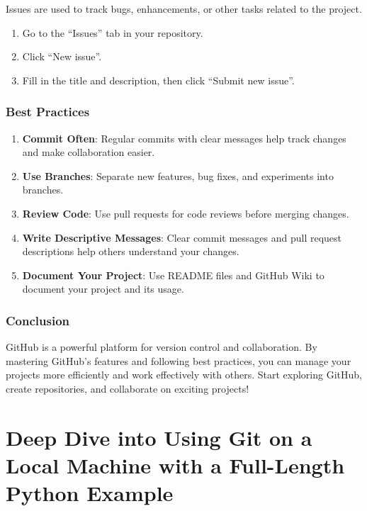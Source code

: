 \documentclass[
  letterpaper,
  DIV=11,
  numbers=noendperiod]{scrreprt}
\providecommand{\tightlist}{%
  \setlength{\itemsep}{0pt}\setlength{\parskip}{0pt}}\usepackage{longtable,booktabs,array}
\begin{document}
Issues are used to track bugs, enhancements, or other tasks related to
the project.

\begin{enumerate}
\def\labelenumi{\arabic{enumi}.}
\tightlist
\item
  Go to the ``Issues'' tab in your repository.
\item
  Click ``New issue''.
\item
  Fill in the title and description, then click ``Submit new issue''.
\end{enumerate}

\subsection{Best Practices}\label{best-practices-6}

\begin{enumerate}
\def\labelenumi{\arabic{enumi}.}
\tightlist
\item
  \textbf{Commit Often}: Regular commits with clear messages help track
  changes and make collaboration easier.
\item
  \textbf{Use Branches}: Separate new features, bug fixes, and
  experiments into branches.
\item
  \textbf{Review Code}: Use pull requests for code reviews before
  merging changes.
\item
  \textbf{Write Descriptive Messages}: Clear commit messages and pull
  request descriptions help others understand your changes.
\item
  \textbf{Document Your Project}: Use README files and GitHub Wiki to
  document your project and its usage.
\end{enumerate}

\subsection{Conclusion}\label{conclusion-45}

GitHub is a powerful platform for version control and collaboration. By
mastering GitHub's features and following best practices, you can manage
your projects more efficiently and work effectively with others. Start
exploring GitHub, create repositories, and collaborate on exciting
projects!


\chapter{Deep Dive into Using Git on a Local Machine with a Full-Length
Python
Example}\label{deep-dive-into-using-git-on-a-local-machine-with-a-full-length-python-example}
\end{document}
